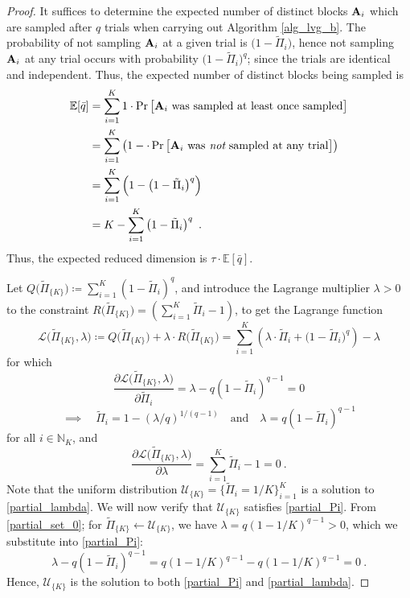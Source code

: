 \documentclass[journal,letterpaper,onecolumn,twoside,nofonttune]{IEEEtran}
\newcommand{\N}{\mathbb{N}}
\newcommand{\E}{\mathbb{E}}
\newcommand{\lag}{\mathscr{L}}
\newcommand{\Uu}{\mathcal{U}}
\newcommand{\qbar}{\bar{q}}
\newcommand{\Ab}{\bold{A}}
\newcommand{\Pit}{\tilde{\Pi}}
\begin{document}
\begin{proof}
It suffices to determine the expected number of distinct blocks $\Ab_i$ which are sampled after $q$ trials when carrying out Algorithm \ref{alg_lvg_b}. The probability of not sampling $\Ab_i$ at a given trial is $\big(1-\Pit_i\big)$, hence not sampling $\Ab_i$ at any trial occurs with probability $\big(1-\Pit_i\big)^q$; since the trials are identical and independent. Thus, the expected number of distinct blocks being sampled is\begin{align*}
  \E[\qbar] &= \sum_{i=1}^K1\cdot\Pr\big[\Ab_i\text{ was sampled at least once sampled}\big]\\
  &= \sum_{i=1}^K\left(1-\cdot\Pr\big[\Ab_i\text{ was} \textit{ not} \text{ sampled at any trial}\big]\right)\\
  &= \sum_{i=1}^K\left(1-\left(1-\Pit_i\right)^q\right)\\
  &= K-\sum_{i=1}^K\left(1-\Pit_i\right)^q\ .
\end{align*}
Thus, the expected reduced dimension is $\tau\cdot\E[\qbar]$.

Let $Q\big(\Pit_{\{K\}}\big)\coloneqq\sum_{i=1}^K(1-\Pit_i)^q$, and introduce the Lagrange multiplier $\lambda>0$ to the constraint $R\big(\Pit_{\{K\}}\big)=\left(\sum_{i=1}^K\Pit_i-1\right)$, to get the Lagrange function
\begin{equation}
\label{Lagr_eq}
  \lag\big(\Pit_{\{K\}},\lambda\big) \coloneqq Q\big(\Pit_{\{K\}}\big)+\lambda\cdot R\big(\Pit_{\{K\}}\big) = \sum_{i=1}^K\left(\lambda\cdot\Pit_i+\big(1-\Pit_i\big)^q\right)-\lambda
\end{equation}
for which
\begin{equation}
\label{partial_Pi}
  \frac{\partial \lag\big(\Pit_{\{K\}},\lambda\big)}{\partial\Pit_i} = \lambda-q(1-\Pit_i)^{q-1} = 0
\end{equation}
\begin{equation}
\label{partial_set_0}
   \implies \quad \Pit_i=1-(\lambda/q)^{1/(q-1)} \quad \text{and} \quad \lambda=q(1-\Pit_i)^{q-1}
\end{equation}
for all $i\in\N_K$, and
\begin{equation}
\label{partial_lambda}
  \frac{\partial \lag\big(\Pit_{\{K\}},\lambda\big)}{\partial\lambda} = \sum_{i=1}^K\Pit_i-1=0\ .
\end{equation}
Note that the uniform distribution $\Uu_{\{K\}}=\big\{\Pit_i=1/K\big\}_{i=1}^K$ is a solution to \eqref{partial_lambda}. We will now verify that $\Uu_{\{K\}}$ satisfies \eqref{partial_Pi}. From \eqref{partial_set_0}; for $\Pit_{\{K\}}\gets\Uu_{\{K\}}$, we have $\lambda=q(1-1/K)^{q-1}>0$, which we substitute into \eqref{partial_Pi}:
\begin{equation}
  \lambda-q(1-\Pit_i)^{q-1} = q(1-1/K)^{q-1} - q(1-1/K)^{q-1}=0\ .
\end{equation}
Hence, $\Uu_{\{K\}}$ is the solution to both \eqref{partial_Pi} and \eqref{partial_lambda}.


\end{proof}
\end{document}
